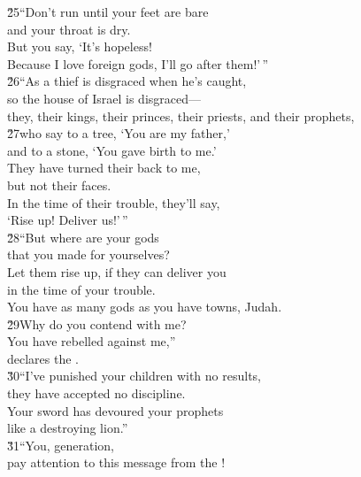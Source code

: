 \begin{poetry}
\poeml \v{25}``Don't run until your feet are bare \\
\poemll    and your throat is dry. \\
\poeml But you say, `It's hopeless! \\
\poemll    Because I love foreign gods, I'll go after them!'\,'' \\
\poeml \v{26}``As a thief is disgraced when he's caught, \\
\poemll    so the house of Israel is disgraced--- \\
\poemlll       they, their kings, their princes, their priests, and their prophets, \\
\poeml \v{27}who say to a tree, `You are my father,' \\
\poemll    and to a stone, `You gave birth to me.' \\
\poeml They have turned their back to me, \\
\poemll    but not their faces. \\
\poeml In the time of their trouble, they'll say, \\
\poemll    `Rise up! Deliver us!'\,'' \\
\poeml \v{28}``But where are your gods \\
\poemll    that you made for yourselves? \\
\poeml Let them rise up, if they can deliver you \\
\poemll    in the time of your trouble. \\
\poemlll       You have as many gods as you have towns, Judah. \\
\poeml \v{29}Why do you contend with me? \\
\poemll    You have rebelled against me,'' \\
\poemlll       declares the . \\
\poeml \v{30}``I've punished your children with no results, \\
\poemll    they have accepted no discipline. \\
\poeml Your sword has devoured your prophets \\
\poemll    like a destroying lion.'' \\
\poeml \v{31}``You, generation, \\
\poemll    pay attention to this message from the ! \\

\end{poetry}
